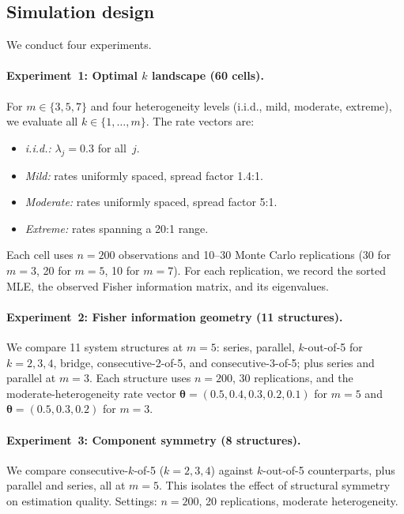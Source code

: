 \documentclass[12pt]{article}
\theoremstyle{definition}
\theoremstyle{remark}
\newcommand{\bthet}{\boldsymbol{\theta}}
\begin{document}
\subsection{Simulation design}
\label{sec:simdesign}

We conduct four experiments.

\paragraph{Experiment~1: Optimal $k$ landscape (60 cells).}
For $m \in \{3, 5, 7\}$ and four heterogeneity levels (i.i.d., mild,
moderate, extreme), we evaluate all $k \in \{1, \ldots, m\}$.
The rate vectors are:
\begin{itemize}
  \item \emph{i.i.d.:} $\lambda_j = 0.3$ for all~$j$.
  \item \emph{Mild:} rates uniformly spaced, spread factor 1.4:1.
  \item \emph{Moderate:} rates uniformly spaced, spread factor 5:1.
  \item \emph{Extreme:} rates spanning a 20:1 range.
\end{itemize}
Each cell uses $n = 200$ observations and 10--30 Monte Carlo replications
(30 for $m = 3$, 20 for $m = 5$, 10 for $m = 7$).
For each replication, we record the sorted MLE, the observed Fisher
information matrix, and its eigenvalues.

\paragraph{Experiment~2: Fisher information geometry (11 structures).}
We compare 11 system structures at $m = 5$:
series, parallel, $k$-out-of-5 for $k = 2, 3, 4$,
bridge, consecutive-2-of-5, and consecutive-3-of-5;
plus series and parallel at $m = 3$.
Each structure uses $n = 200$, 30 replications, and the
moderate-heterogeneity rate vector
$\bthet = (0.5, 0.4, 0.3, 0.2, 0.1)$ for $m = 5$ and
$\bthet = (0.5, 0.3, 0.2)$ for $m = 3$.

\paragraph{Experiment~3: Component symmetry (8 structures).}
We compare consecutive-$k$-of-5 ($k = 2, 3, 4$) against
$k$-out-of-5 counterparts, plus parallel and series, all at $m = 5$.
This isolates the effect of structural symmetry on estimation quality.
Settings: $n = 200$, 20 replications, moderate heterogeneity.
\end{document}
